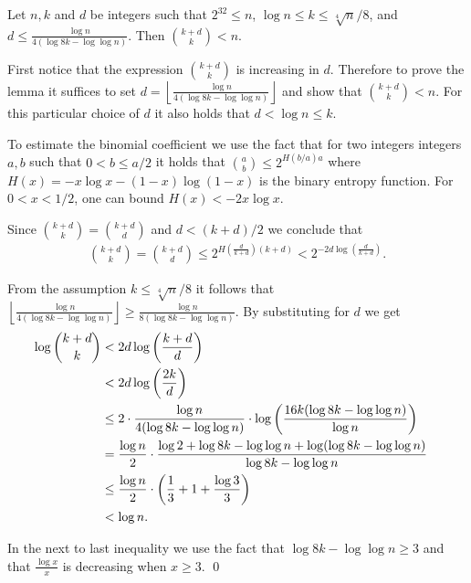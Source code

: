\documentclass[runningheads,a4paper]{llncs}
\renewenvironment{proof}{\noindent{\it Proof. }} {{\qed}}
\begin{document}
\begin{lemma}
\label{lm:lower_bound_d} 
Let $n,k$ and $d$ be integers such that $2^{32} \leq n$, $\log n \le k \le \sqrt[4]{n}/8$, and 
$d \le \frac{\log n}{4 (\log 8k - \log \log n)}$. Then ${k+d \choose k} < n$. 
\end{lemma}

\begin{proof}  %
First notice that the expression ${k+d \choose k}$ is increasing in $d$.
Therefore to prove the lemma it suffices to set $d = \left\lfloor \frac{\log n}{4 (\log 8k - \log \log n)} \right\rfloor$ 
and show that ${k +d \choose k} < n$.  For this particular choice of $d$ it also holds that $d < \log n \leq k$. 

To estimate the binomial coefficient we use the fact that for two integers integers $a, b$ 
such that $0 < b \leq a/2$ it holds that ${a \choose b} \leq 2^{H(b/a) a}$
where $H(x) = - x \log x - (1-x) \log (1-x)$ is the binary entropy function.
For $0<x<1/2$, one can bound $H(x) < -2x \log x$. 

Since ${k+d \choose k}= {k+d \choose d}$ and $d < (k + d)/2$ we conclude that
\begin{align*}
{k+d \choose k} = {k+d \choose d} \leq 2^{H\left(\frac{d}{k + d}\right)(k+d)} < 2^{-2d\log\left(\frac{d}{k + d}\right)}.
\end{align*}

From the assumption $k \leq \sqrt[4]{n}/8$ it follows 
that $\left\lfloor \frac{\log n}{4 (\log 8k - \log \log n)} \right\rfloor \ge \frac{\log n}{8 (\log 8k - \log \log n)}$.
By substituting for $d$ we get
\begin{align*}
\log {k + d \choose k}
        & < 2d \log\left(\frac{k + d}{d}\right) \cr
        & < 2d \log\left(\frac{2k}{d}\right) \cr
        & \le 2 \cdot \frac{\log n}{4(\log 8k - \log \log n)} \cdot \log \left(\frac{16k (\log 8k - \log \log n)}{\log n}\right) \cr
        & = \frac{\log n}{2} \cdot \frac{\log 2 + \log 8k - \log \log n + \log (\log 8k - \log \log n)}{\log 8k - \log \log n} \cr
        & \le \frac{\log n}{2} \cdot \left(\frac{1}{3} + 1 + \frac{\log 3}{3}\right) \cr
        & < \log n.
\end{align*}

In the next to last inequality we use the fact that $\log 8k - \log \log n \geq 3$ and that $\frac{\log x}{x}$ is decreasing 
when $x \geq 3$.
\end{proof}
\end{document}
